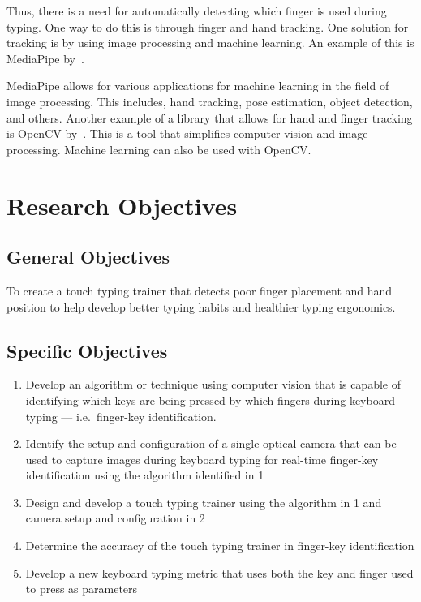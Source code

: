 \documentclass{report}
\begin{document}
Thus, there is a need for automatically detecting which finger is used during
typing. One way to do this is through finger and hand tracking. One solution for
tracking is by using image processing and machine learning. An example of this
is MediaPipe by~\cite{mediapipe}.

MediaPipe allows for various applications for machine learning in the field of
image processing. This includes, hand tracking, pose estimation, object
detection, and others. Another example of a library that allows for hand and
finger tracking is OpenCV by~\cite{opencv}. This is a tool that simplifies
computer vision and image processing. Machine learning can also be used with
OpenCV.\@

\section{Research Objectives}

\subsection{General Objectives}
To create a touch typing trainer that detects poor finger placement and hand
position to help develop better typing habits and healthier typing ergonomics.

\subsection{Specific Objectives}
\begin{enumerate}
	\item Develop an algorithm or technique using computer vision that is capable
	      of identifying which keys are being pressed by which fingers during keyboard
	      typing --- i.e.\ finger-key identification.
	\item Identify the setup and configuration of a single optical camera that can
	      be used to capture images during keyboard typing for real-time finger-key
	      identification using the algorithm identified in 1
	\item Design and develop a touch typing trainer using the algorithm in 1 and
	      camera setup and configuration in 2
	\item Determine the accuracy of the touch typing trainer in finger-key
	      identification
	\item Develop a new keyboard typing metric that uses both the key and
	      finger used to press as parameters
\end{enumerate}
\end{document}
